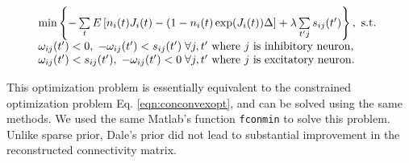 \begin{equation}
\begin{array}{l}
\min \left\{-\sum\limits_t E\left[ n_i(t) J_i(t) - (1-n_i(t) \exp(J_i(t)) \Delta \right]+\lambda \sum\limits_{t'j}s_{ij}(t')\right\}, \text{ s.t. }\\
\omega_{ij}(t')<0, \; -\omega_{ij}(t')<s_{ij}(t') \; \forall j, t'\text{ where }j\text{ is inhibitory neuron}, \\
\omega_{ij}(t')<s_{ij}(t'), \; -\omega_{ij}(t')<0 \; \forall j, t'\text{ where }j\text{ is excitatory neuron}. \\
\end{array}
\end{equation}

This optimization problem is essentially equivalent to the constrained optimization problem Eq. \eqref{eqn:conconvexopt}, and can be solved using the same methods. We used the same Matlab's function \texttt{fconmin} to solve this problem. Unlike sparse prior, Dale's prior did not lead to substantial improvement in the reconstructed connectivity matrix.
